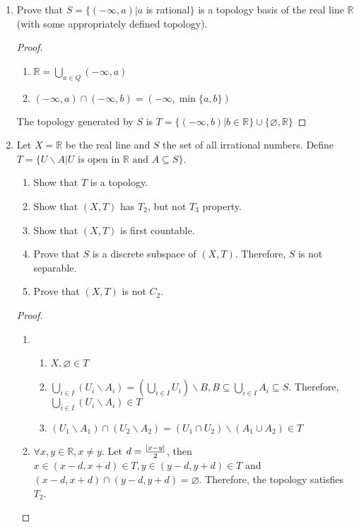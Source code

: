 \documentclass{article}
\DeclarePairedDelimiter\abs{\lvert}{\rvert}
\def\emptyset{\varnothing}
\begin{document}
\courseheader
{}
\begin{enumerate}
\item Prove that $S=\{(-\infty,a) | a$ is rational$\}$ is a topology basis of the real line $\mathbb{R}$ (with some appropriately defined topology).
\begin{proof}\mbox{}
\begin{enumerate}
\item $\displaystyle\mathbb{R}=\bigcup_{a\in Q} (-\infty,a)$
\item $(-\infty,a)\cap (-\infty,b)=(-\infty,\min\{a,b\})$
\end{enumerate}
The topology generated by $S$ is $T=\{(-\infty,b)|b\in \mathbb{R}\}\cup\{\emptyset,\mathbb{R}\}$
\end{proof}
\item Let $X=\mathbb{R}$ be the real line and $S$ the set of all irrational numbers. Define $T=\{U\backslash A | U \textrm{ is open in }\mathbb{R} \textrm{ and } A\subseteq S\}$.
\begin{enumerate}[label=(\alph*)]
\item Show that $T$ is a topology.
\item Show that $(X,T)$ has $T_2$, but not $T_3$ property.
\item Show that $(X,T)$ is first countable.
\item Prove that $S$ is a discrete subspace of $(X,T)$. Therefore, $S$ is not separable.
\item Prove that $(X,T)$ is not $C_2$.
\end{enumerate}
\begin{proof}\mbox{}
\begin{enumerate}[label=(\alph*)]
\item 
\begin{enumerate}[label=(\roman*)]
\item $X,\emptyset \in T$

\item $\displaystyle\bigcup_{i\in I} (U_i \backslash A_i) = (\bigcup_{i\in I}U_i)\backslash B,B\subseteq \bigcup_{i\in I}A_i\subseteq S $. Therefore, $\displaystyle\bigcup_{i\in I} (U_i \backslash A_i)\in T$
\item $(U_1\backslash A_1)\cap (U_2\backslash A_2) = (U_1\cap U_2)\backslash (A_1\cup A_2) \in T$
\end{enumerate}
\item $\forall x,y \in \mathbb{R},x\neq y$. Let $d={\abs{x-y} \over 2}$, then $x\in (x-d,x+d)\in T,y\in (y-d,y+d)\in T$ and $(x-d,x+d)\cap (y-d,y+d)=\emptyset$. Therefore, the topology satisfies $T_2$. 


\end{enumerate}
\end{proof}
\end{enumerate}
\end{document}
